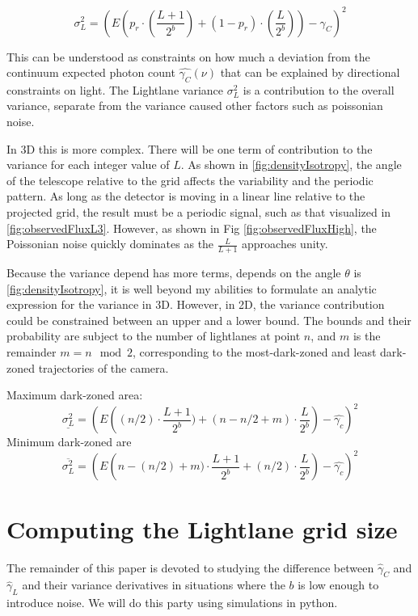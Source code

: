 \documentclass[notitlepage]{article}
\begin{document}
\begin{equation}
	\sigma_L^2 = \left(E\left(p_r \cdot (\frac{L+1}{2^b}) + (1-p_r) \cdot (\frac{L}{2^b}) \right)- \gamma_C \right)^2
	\label{eq:TwinkleVariance2}
\end{equation}

This can be understood as constraints on how much a deviation from the continuum expected photon count $\hat{\gamma_C}(\nu)$ that can be explained by directional constraints on light. The Lightlane variance $\sigma_L^2$  is a contribution to the overall variance, separate from the variance caused other factors such as poissonian noise.

In 3D this is more complex. There will be one term of contribution to the variance for each integer value of $L$. As shown in \ref{fig:densityIsotropy}, the angle of the telescope relative to the grid affects the variability and the periodic pattern. As long as the detector is moving in a linear line relative to the projected grid, the result must be a periodic signal, such as that visualized in \ref{fig:observedFluxL3}. However, as shown in Fig \ref{fig:observedFluxHigh}, the Poissonian noise quickly dominates as the $\frac{L}{L+1}$ approaches unity. 

Because the variance depend has more terms, depends on the angle $\theta$ is \ref{fig:densityIsotropy}, it is well beyond my  abilities to formulate an analytic expression for the variance in 3D. However, in 2D, the variance contribution could be constrained between an upper and a lower bound. The bounds and their probability are subject to the number of lightlanes at point $n$, and $m$ is the remainder $m = n \mod 2$, corresponding to the most-dark-zoned and least dark-zoned trajectories of the camera.

Maximum dark-zoned area:
\begin{equation}
\underline{\sigma_L^2} 
 = \left(E\left((n / 2)  \cdot \frac{L+1}{2^b})
  + (n - n/2   +m) \cdot \frac{L}{2^b} \right) - \hat{\gamma_c} \right)^2
	\label{eq:TwinkleVariance3}
\end{equation}
Minimum dark-zoned are 
\begin{equation}
\overline{\sigma_L^2}
	 = \left(E\left(n-(n / 2) + m) \cdot \frac{L+1}{2^b} + (n/2   ) \cdot \frac{L}{2^b} \right)- \hat{\gamma_c} \right)^2
	\label{eq:TwinkleVariance4}
\end{equation}

\section{Computing the Lightlane grid size}
The remainder of this paper is devoted to studying the difference between $\hat{\gamma}_C$ and $\hat{\gamma}_L$ and their variance derivatives in situations where the $b$ is low enough to introduce noise. We will do this party using simulations in python.
\end{document}
